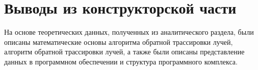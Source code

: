 \section{Выводы из конструкторской части}

На основе теоретических данных, полученных из аналитического раздела,
были описаны математические основы алгоритма обратной трассировки лучей, алгоритм обратной трассировки лучей,
а также были описаны представление данных в программном обеспечении и структура программного комплекса.
